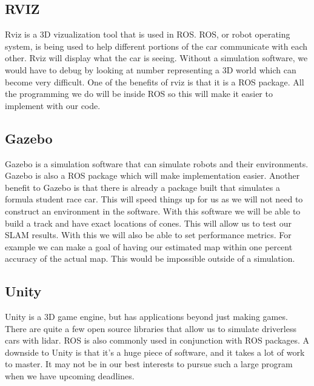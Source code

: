 \documentclass[10pt, onecolumn, draftclsnofoot, letterpaper,compsoc]{IEEEtran}
\begin{document}
\subsection{RVIZ}
Rviz is a 3D vizualization tool that is used in ROS. ROS, or robot operating system, is being used to help different portions of the car communicate with each other. Rviz will display what the car is seeing. Without a simulation software, we would have to debug by looking at number representing a 3D world which can become very difficult. One of the benefits of rviz is that it is a ROS package. All the programming we do will be inside ROS so this will make it easier to implement with our code.

\subsection{Gazebo}
Gazebo is a simulation software that can simulate robots and their environments. Gazebo is also a ROS package which will make implementation easier. Another benefit to Gazebo is that there is already a package built that simulates a formula student race car. This will speed things up for us as we will not need to construct an environment in the software. With this software we will be able to build a track and have exact locations of cones. This will allow us to test our SLAM results. With this we will also be able to set performance metrics. For example we can make a goal of having our estimated map within one percent accuracy of the actual map. This would be impossible outside of a simulation.

\subsection{Unity}
Unity is a 3D game engine, but has applications beyond just making games. There are quite a few open source libraries that allow us to simulate driverless cars with lidar. ROS is also commonly used in conjunction with ROS packages. A downside to Unity is that it's a huge piece of software, and it takes a lot of work to master. It may not be in our best interests to pursue such a large program when we have upcoming deadlines.



\end{document}
